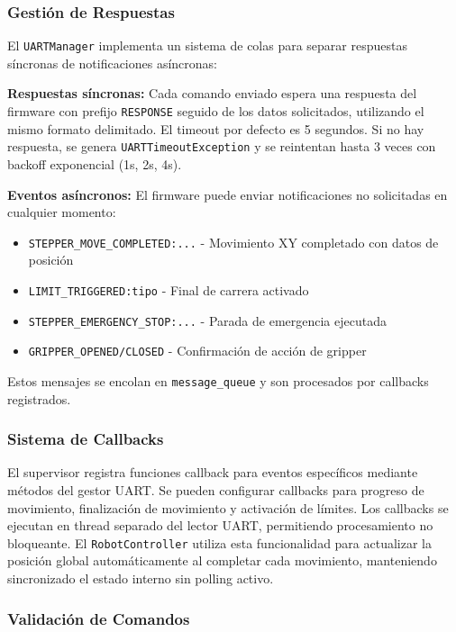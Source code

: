 \subsubsection{Gestión de Respuestas}

El \texttt{UARTManager} implementa un sistema de colas para separar respuestas síncronas de notificaciones asíncronas:

\textbf{Respuestas síncronas:} Cada comando enviado espera una respuesta del firmware con prefijo \texttt{RESPONSE} seguido de los datos solicitados, utilizando el mismo formato delimitado. El timeout por defecto es 5 segundos. Si no hay respuesta, se genera \texttt{UARTTimeoutException} y se reintentan hasta 3 veces con backoff exponencial (1s, 2s, 4s).

\textbf{Eventos asíncronos:} El firmware puede enviar notificaciones no solicitadas en cualquier momento:
\begin{itemize}
    \item \texttt{STEPPER\_MOVE\_COMPLETED:...} - Movimiento XY completado con datos de posición
    \item \texttt{LIMIT\_TRIGGERED:tipo} - Final de carrera activado
    \item \texttt{STEPPER\_EMERGENCY\_STOP:...} - Parada de emergencia ejecutada
    \item \texttt{GRIPPER\_OPENED/CLOSED} - Confirmación de acción de gripper
\end{itemize}

Estos mensajes se encolan en \texttt{message\_queue} y son procesados por callbacks registrados.

\subsubsection{Sistema de Callbacks}

El supervisor registra funciones callback para eventos específicos mediante métodos del gestor UART. Se pueden configurar callbacks para progreso de movimiento, finalización de movimiento y activación de límites. Los callbacks se ejecutan en thread separado del lector UART, permitiendo procesamiento no bloqueante. El \texttt{RobotController} utiliza esta funcionalidad para actualizar la posición global automáticamente al completar cada movimiento, manteniendo sincronizado el estado interno sin polling activo.

\subsubsection{Validación de Comandos}

